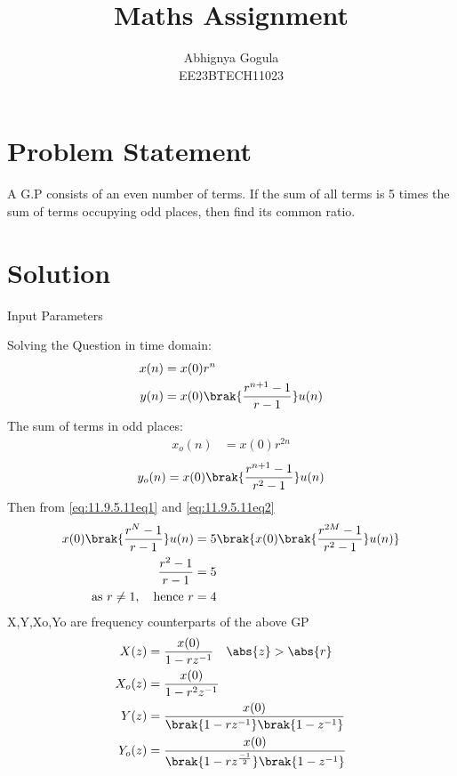 \documentclass[journal,12pt,twocolumn]{IEEEtran}
\theoremstyle{remark}
\begin{document}

\title{Maths Assignment}
\author{Abhignya Gogula\\
        EE23BTECH11023}
\maketitle
\section*{Problem Statement}
A G.P consists of an even number of terms. If the sum of all terms is 5 times the sum of terms occupying odd places, then find its common ratio.
\section*{Solution}
\fi
\begin{table}[h!]
\centering

\caption{Input Parameters}
\label{11.9.5.11tab1}
\end{table}
Solving the Question in time domain:
\begin{align}
x(n) &= x(0)r^{n} \\
y(n) &= x(0)\brak{\frac{r^{n+1}-1}{r-1}}u(n)
\label{eq:11.9.5.11eq1}
\end{align}
The sum of terms in odd places:
\begin{align}
x_o(n) &= x(0)r^{2n}
\end{align}
\begin{equation}
y_o(n)= x(0)\brak{\frac{r^{n+1}-1}{r^2-1}}u(n)
\label{eq:11.9.5.11eq2}
\end{equation}
Then from \eqref{eq:11.9.5.11eq1} and \eqref{eq:11.9.5.11eq2}
\begin{align}
x(0)\brak{\frac{r^{N}-1}{r-1}}u(n) &= 5\brak{x(0)\brak{\frac{r^{2M}-1}{r^2-1}}u(n)}\\
\frac{r^2-1}{r-1} &= 5\\
\text{as } r \neq 1, \quad \text{hence } r &= 4\\
\end{align}
X,Y,Xo,Yo are frequency counterparts of the above GP
\begin{align}
X(z) &= \frac{x(0)}{1-rz^{-1}} \quad \abs{z} > \abs{r}\\ 
X_o(z) &= \frac{x(0)}{1-r^{2}z^{-1}}\\
Y(z) &= \frac{x(0)}{\brak{1-rz^{-1}}\brak{1-z^{-1}}}\\
Y_o(z) &= \frac{x(0)}{\brak{1-rz^{\frac{-1}{2}}}\brak{1-z^{-1}}}
\end{align}
\end{document}
